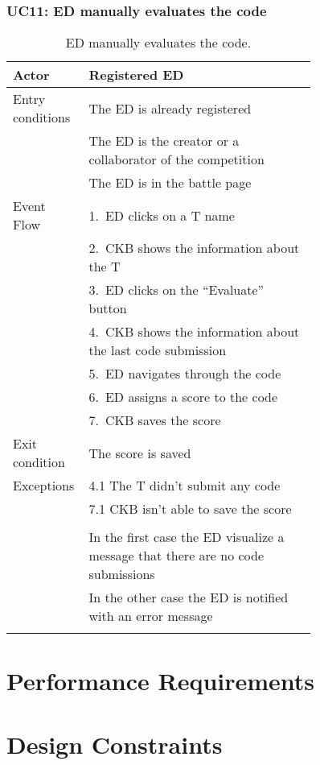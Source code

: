 \subsubsection*{UC11: ED manually evaluates the code}
\begin{center}
  \begin{longtable}{l|p{0.75\linewidth}}
    \hline
    Actor & Registered ED \\
    \hline
    Entry conditions & The ED is already registered  \\
    & The ED is the creator or a collaborator of the competition \\
    & The ED is in the battle page \\
    \hline
    Event Flow & 1.\ ED clicks on a T name \\
    & 2.\ CKB shows the information about the T \\
    & 3.\ ED clicks on the “Evaluate” button \\
    & 4.\ CKB shows the information about the last code submission \\
    & 5.\ ED navigates through the code \\
    & 6.\ ED assigns a score to the code \\
    & 7.\ CKB saves the score \\
    \hline
    Exit condition &  The score is saved \\
    \hline
    Exceptions & 4.1 The T didn't submit any code \\
    & 7.1 CKB isn’t able to save the score \\ \\
    & In the first case the ED visualize a message that there are no code submissions \\
    & In the other case the ED is notified with an error message \\
    \hline
    \caption{ED manually evaluates the code.}
    \label{tab: ED_evaluate_code}
  \end{longtable}
\end{center}


\section{Performance Requirements}
\label{s:Performance_requirements}%

\section{Design Constraints}
\label{s:Design_constraints}%

